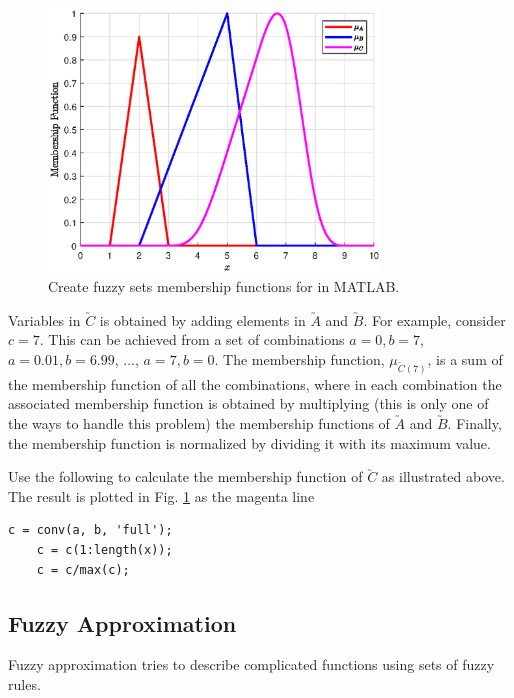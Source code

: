\begin{figure}
	\centering
	\includegraphics[width=250pt]{chapters/ch-fuzzy-control-system/figures/exp_createfuzzyset.eps}
	\caption{Create fuzzy sets membership functions for in MATLAB.}
	\label{ch:fcs:fig:exp_createfuzzyset}
\end{figure}

Variables in $\utilde{C}$ is obtained by adding elements in $\utilde{A}$ and $\utilde{B}$. For example, consider $c = 7$. This can be achieved from a set of combinations $a=0, b=7$, $a=0.01, b=6.99$, ..., $a = 7, b = 0$. The membership function, $\mu_{\utilde{C}(7)}$, is a sum of the membership function of all the combinations, where in each combination the associated membership function is obtained by multiplying (this is only one of the ways to handle this problem) the membership functions of $\utilde{A}$ and $\utilde{B}$. Finally, the membership function is normalized by dividing it with its maximum value.

Use the following to calculate the membership function of $\utilde{C}$ as illustrated above. The result is plotted in Fig. \ref{ch:fcs:fig:exp_createfuzzyset} as the magenta line
\begin{lstlisting}[style=Matlab-editor]
	c = conv(a, b, 'full');
	c = c(1:length(x));
	c = c/max(c);
\end{lstlisting}

\subsection{Fuzzy Approximation}

Fuzzy approximation tries to describe complicated functions using sets of  fuzzy rules.













